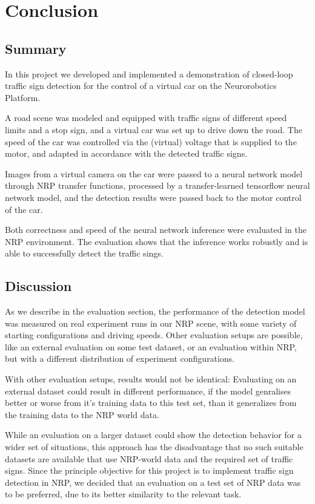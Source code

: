 
\section{Conclusion}

\subsection{Summary}

In this project we developed and implemented a demonstration of closed-loop traffic sign detection for the control of a virtual car on the Neurorobotics Platform. 

A road scene was modeled and equipped with traffic signs of different speed limits and a stop sign, and a virtual car was set up to drive down the road. The speed of the car was controlled via the (virtual) voltage that is supplied to the motor, and adapted in accordance with the detected traffic signs.

Images from a virtual camera on the car were passed to a neural network model through NRP transfer functions, processed by a transfer-learned tensorflow neural network model, and the detection results were passed back to the motor control of the car.

Both correctness and speed of the neural network inference were evaluated in the NRP environment. The evaluation shows that the inference works robustly and is able to successfully detect the traffic sings.

\subsection{Discussion}
As we describe in the evaluation section, the performance of the detection model was measured on real experiment runs in our NRP scene, with some variety of starting configurations and driving speeds. Other evaluation setups are possible, like an external evaluation on some test dataset, or an evaluation within NRP, but with a different distribution of experiment configurations.

With other evaluation setups, results would not be identical: Evaluating on an external dataset could result in different performance, if the model genralises better or worse from it's training data to this test set, than it generalizes from the training data to the NRP world data.

While an evaluation on a larger dataset could show the detection behavior for a wider set of situations, this approach has the disadvantage that no such suitable datasets are available that use NRP-world data and the required set of traffic signs. Since the principle objective for this project is to implement traffic sign detection in NRP, we decided that an evaluation on a test set of NRP data was to be preferred, due to its better similarity to the relevant task.


